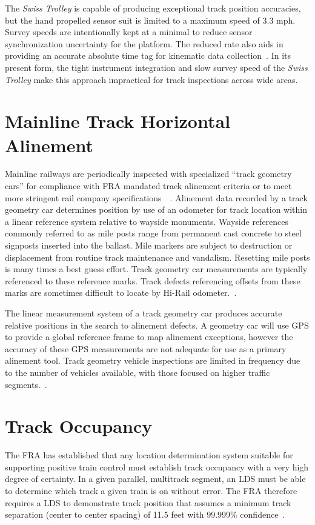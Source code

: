 The \emph{Swiss Trolley} is capable of producing exceptional track position accuracies, but the hand propelled sensor suit is limited to a maximum speed of 3.3 mph. Survey speeds are intentionally kept at a minimal to reduce sensor synchronization uncertainty for the platform. The reduced rate also aids in providing an accurate absolute time tag for kinematic data collection~\citep{2006glaus}. In its present form, the tight instrument integration and slow survey speed of the \emph{Swiss Trolley} make this approach impractical for track inspections across wide areas.

\section{Mainline Track Horizontal Alinement}Mainline railways are periodically inspected with specialized ``track geometry cars'' for compliance with FRA mandated track alinement criteria or to meet more stringent rail company specifications~\citep{49CFR213D}~\citep{2009bright}. Alinement data recorded by a track geometry car determines position by use of an odometer for track location within a linear reference system relative to wayside monuments. Wayside references commonly referred to as mile posts range from permanent cast concrete to steel signposts inserted into the ballast. Mile markers are subject to destruction or displacement from routine track maintenance and vandalism. Resetting mile posts is many times a best guess effort. Track geometry car measurements are typically referenced to these reference marks. Track defects referencing offsets from these marks are sometimes difficult to locate by Hi-Rail odometer.~\citep{2009vanPelt}.

The linear measurement system of a track geometry car produces accurate relative positions in the search to alinement defects. A geometry car will use GPS to provide a global reference frame to map alinement exceptions, however the accuracy of these GPS measurements are not adequate for use as a primary alinement tool. Track geometry vehicle inspections are limited in frequency due to the number of vehicles available, with those focused on higher traffic  segments.~\citep{2009bright.rtrack}.

\section{Track Occupancy}The FRA has established that any location determination system suitable for supporting positive train control must establish track occupancy with a very high degree of certainty. In a given parallel, multitrack segment, an LDS must be able to determine which track a given train is on without error. The FRA therefore requires a LDS to demonstrate track position that assumes a minimum track separation (center to center spacing) of 11.5 feet with 99.999\% confidence~\citep[4-5]{1995FRADiffe}.

